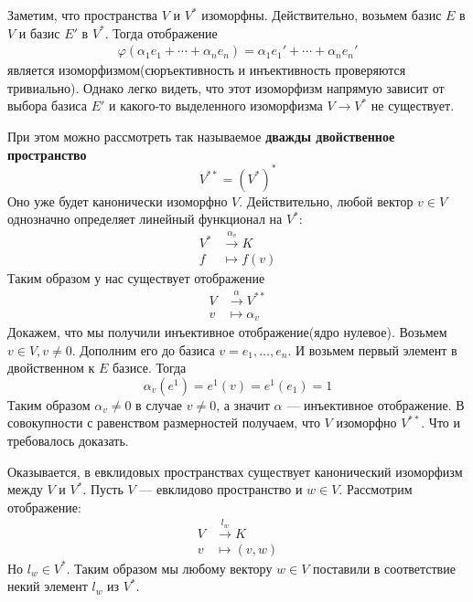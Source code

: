 \documentclass[../main.tex]{subfiles}
\begin{document}
Заметим, что пространства $V$ и $V^{*}$ изоморфны. Действительно, возьмем базис $E$ в $V$ и базис $E'$ в $V^{*}$. Тогда отображение
\begin{equation*}
  \begin{gathered}
    \varphi(\alpha_1 e_1 + \dotsb + \alpha_n e_n) = \alpha_1 e_1' + \dotsb + \alpha_n e_n'
  \end{gathered}
\end{equation*}
является изоморфизмом(сюръективность и инъективность проверяются тривиально). Однако легко видеть, что этот изоморфизм напрямую зависит от выбора базиса $E'$ и какого-то выделенного изоморфизма $V \to V^{*}$ не существует.

При этом можно рассмотреть так называемое \textbf{дважды двойственное пространство}
\begin{equation*}
  V^{**} = (V^{*})^{*}
\end{equation*}
Оно уже будет канонически изоморфно $V$. Действительно, любой вектор $v \in V$ однозначно определяет линейный функционал на $V^{*}$:
\begin{align*}
  V^{*} &\overset{\alpha_v}{\longrightarrow} K \\
  f &\longmapsto f(v)
\end{align*}
Таким образом у нас существует отображение
\begin{align*}
  V &\overset{\alpha}{\longrightarrow} V^{**} \\
  v &\longmapsto \alpha_v
\end{align*}
Докажем, что мы получили инъективное отображение(ядро нулевое). Возьмем $v \in V, v \neq 0$. Дополним его до базиса $v = e_1, \dotsc, e_n$. И возьмем первый элемент в двойственном к $E$ базисе. Тогда
\begin{equation*}
  \alpha_v(e^{1}) = e^{1}(v) = e^{1}(e_1) = 1
\end{equation*}
Таким образом $\alpha_v \neq 0$ в случае $v \neq 0$, а значит $\alpha$ --- инъективное отображение. В совокупности с равенством размерностей получаем, что $V$ изоморфно $V^{**}$. Что и требовалось доказать.

Оказывается, в евклидовых пространствах существует канонический изоморфизм между $V$ и $V^{*}$. Пусть $V$ --- евклидово пространство и $w \in V$. Рассмотрим отображение:
\begin{align*}
  V &\overset{l_w}{\longrightarrow} K \\
  v &\longmapsto (v, w)
\end{align*}
Но $l_w \in V^{*}$. Таким образом мы любому вектору $w \in V$ поставили в соответствие некий элемент $l_w$ из $V^{*}$.
\end{document}
